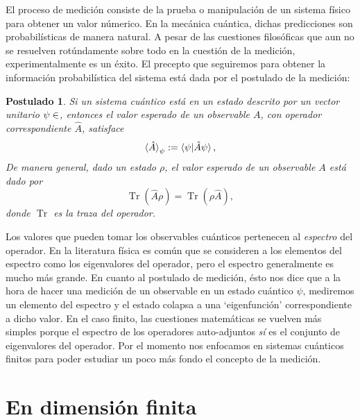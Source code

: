 \documentclass[a4paper,11pt]{report}
\let\H\relax
\DeclareMathOperator{\H}{\mathcal H}
\DeclareMathOperator{\Tr}{Tr}
\newtheorem{axiom}{Postulado}
\begin{document}
  El proceso de medición consiste de la prueba o
  manipulación de un sistema físico para obtener un valor
  númerico. En la mecánica cuántica, dichas predicciones son
  probabilísticas de manera natural. A pesar de las
  cuestiones filosóficas que aun no se resuelven
  rotúndamente sobre todo en la cuestión de la medición,
  experimentalmente es un éxito. El precepto que seguiremos
  para obtener la información probabilística del sistema
  está dada por el postulado de la medición:
  \begin{axiom}
    \label{ax:3}
    Si un sistema cuántico está en un estado descrito por un
    vector unitario $\psi \in \H$, entonces el valor
    esperado de un observable $A$, con operador
    correspondiente $\hat A$, satisface
    \[
      \braket{\hat A}_\psi
      := \braket{\psi|\hat A \psi},
    \] 
    De manera general, dado un estado $\rho$, el valor
    esperado de un observable $A$ está dado por
    \[
      \Tr\left(\hat{A}\rho\right)
      = \Tr\left( \rho\hat{A} \right),
    \]
    donde $\Tr$ es la traza del operador.
  \end{axiom}
  Los valores que pueden tomar los observables cuánticos
  pertenecen al \textit{espectro} del operador. En la
  literatura física es común que se consideren a los
  elementos del espectro como los eigenvalores del operador,
  pero el espectro generalmente es mucho más grande. En
  cuanto al postulado de medición, ésto nos dice que a la
  hora de hacer una medición de un observable en un estado
  cuántico $\psi$, mediremos un elemento del espectro y el
  estado colapsa a una `eigenfunción' correspondiente a
  dicho valor. En el caso finito, las cuestiones matemáticas
  se vuelven más simples porque el espectro de los
  operadores auto-adjuntos \textit{sí} es el conjunto de
  eigenvalores del operador. Por el momento nos enfocamos en
  sistemas cuánticos finitos para poder estudiar un poco más
  fondo el concepto de la medición.

  \section{En dimensión finita}
\end{document}
